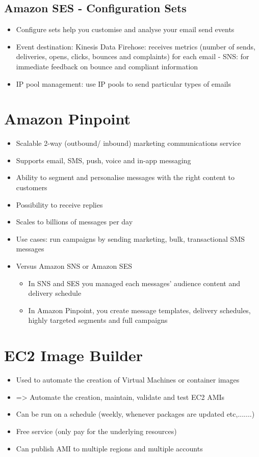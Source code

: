 \subsection{Amazon SES - Configuration Sets}
\begin{itemize}
    \item Configure sets help you customise and analyse your email send events
    \item Event destination:
    Kinesis Data Firehose: receives metrics (number of sends, deliveries, opens, clicks, bounces and complaints) for each email
    - SNS: for immediate feedback on bounce and compliant information
    \item IP pool management: use IP pools to send particular types of emails
\end{itemize}


\section{Amazon Pinpoint}
\begin{itemize}
    \item Scalable 2-way (outbound/ inbound) marketing communications service
    \item Supports email, SMS, push, voice and in-app messaging
    \item Ability to segment and personalise messages with the right content to customers
    \item Possibility to receive replies
    \item Scales to billions of messages per day
    \item Use cases: run campaigns by sending marketing, bulk, transactional SMS messages
    \item Versus Amazon SNS or Amazon SES
    \begin{itemize}
        \item In SNS and SES you managed each messages' audience content and delivery schedule
        \item In Amazon Pinpoint, you create message templates, delivery schedules, highly targeted segments and full campaigns
    \end{itemize}
\end{itemize}


\section{EC2 Image Builder}
\begin{itemize}
    \item Used to automate the creation of Virtual Machines or container images
    \item => Automate the creation, maintain, validate and test EC2 AMIs
    \item Can be run on a schedule (weekly, whenever packages are updated etc,.......)
    \item Free service (only pay for the underlying resources)
    \item Can publish AMI to multiple regions and multiple accounts
\end{itemize}

